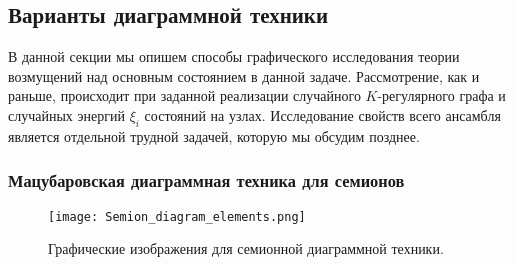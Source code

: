 \subsection{Варианты диаграммной техники}
В данной секции мы опишем способы графического исследования теории возмущений над основным состоянием в данной задаче. Рассмотрение, как и раньше, происходит при заданной реализации случайного $K$-регулярного графа и случайных энергий $\xi_i$ состояний на узлах. Исследование свойств всего ансамбля является отдельной трудной задачей, которую мы обсудим позднее.

\subsubsection{Мацубаровская диаграммная техника для семионов}

\begin{figure}[h]
	\label{fig:Semion_diagram_technique}
	\centering
	\texttt{[image: Semion\_diagram\_elements.png]}
	\caption{Графические изображения для семионной диаграммной техники.}	
\end{figure}

